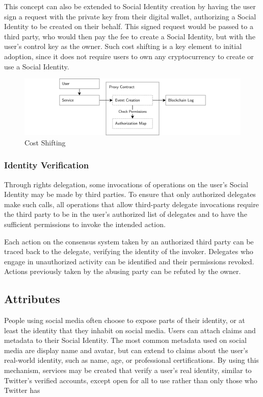 \documentclass[12pt,letterpaper]{article}
\begin{document}
This concept can also be extended to Social Identity creation by having the user sign a
request with the private key from their digital wallet, authorizing a Social Identity to be
created on their behalf. This signed request would be passed to a third party, who would
then pay the fee to create a Social Identity, but with the user's control key as the
owner. Such cost shifting is a key element to initial adoption, since it does not require
users to own any cryptocurrency to create or use a Social Identity.

\begin{figure}
	\includegraphics[width=\linewidth]{figures/Cost Shifting.png}
	\caption{Cost Shifting}
	\label{fig:2}
\end{figure}

\subsubsection{Identity Verification}

Through rights delegation, some invocations of operations on the user's Social Identity may
be made by third parties. To ensure that only authorized delegates make such calls, all
operations that allow third-party delegate invocations require the third party to be in the
user's authorized list of delegates and to have the sufficient permissions to invoke the
intended action.

Each action on the consensus system taken by an authorized third party can be traced back to
the delegate, verifying the identity of the invoker. Delegates who engage in unauthorized
activity can be identified and their permissions revoked. Actions previously taken by the
abusing party can be refuted by the owner.

\subsection{Attributes}\label{sec:attributes}

People using social media often choose to expose parts of their identity, or at least the
identity that they inhabit on social media. Users can attach claims and metadata to their
Social Identity. The most common metadata used on social media are display name and avatar,
but can extend to claims about the user's real-world identity, such as name, age, or
professional certifications. By using this mechanism, services may be created that verify a
user's real identity, similar to Twitter's verified accounts, except open for all to use rather
than only those who Twitter has \cite{twitter_verified_accounts}
\end{document}
